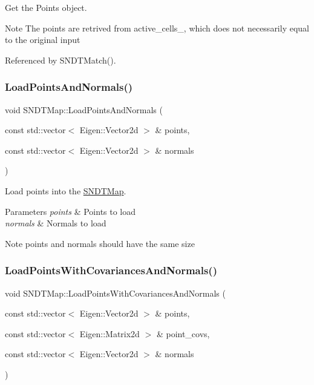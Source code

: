 Get the Points object. 

\begin{DoxyNote}{Note}
The points are retrived from active\+\_\+cells\+\_\+, which does not necessarily equal to the original input 
\end{DoxyNote}


Referenced by S\+N\+D\+T\+Match().

\mbox{\label{classSNDTMap_ad755706650d16e50957a9c7a7772f961}} 
\subsubsection{\texorpdfstring{Load\+Points\+And\+Normals()}{LoadPointsAndNormals()}}
{\footnotesize\ttfamily void S\+N\+D\+T\+Map\+::\+Load\+Points\+And\+Normals (\begin{DoxyParamCaption}\item[{const std\+::vector$<$ Eigen\+::\+Vector2d $>$ \&}]{points,  }\item[{const std\+::vector$<$ Eigen\+::\+Vector2d $>$ \&}]{normals }\end{DoxyParamCaption})}



Load points into the \hyperlink{classSNDTMap}{S\+N\+D\+T\+Map}. 


\begin{DoxyParams}{Parameters}
{\em points} & Points to load \\
\hline
{\em normals} & Normals to load \\
\hline
\end{DoxyParams}
\begin{DoxyNote}{Note}
{\ttfamily points} and {\ttfamily normals} should have the same size 
\end{DoxyNote}
\mbox{\label{classSNDTMap_afb229d2c2a8d58523743c0954fb8c0a8}} 
\subsubsection{\texorpdfstring{Load\+Points\+With\+Covariances\+And\+Normals()}{LoadPointsWithCovariancesAndNormals()}}
{\footnotesize\ttfamily void S\+N\+D\+T\+Map\+::\+Load\+Points\+With\+Covariances\+And\+Normals (\begin{DoxyParamCaption}\item[{const std\+::vector$<$ Eigen\+::\+Vector2d $>$ \&}]{points,  }\item[{const std\+::vector$<$ Eigen\+::\+Matrix2d $>$ \&}]{point\+\_\+covs,  }\item[{const std\+::vector$<$ Eigen\+::\+Vector2d $>$ \&}]{normals }\end{DoxyParamCaption})}



